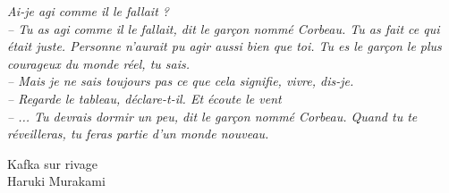 \thispagestyle{empty}



\vspace*{\fill} \epigraph{\itshape  Ai-je agi comme il le fallait ? \\
– Tu as agi comme il le fallait, dit le garçon nommé Corbeau. Tu as fait ce qui était juste. Personne n’aurait pu agir aussi bien que toi. Tu es le garçon le plus courageux du monde réel, tu sais. \\
– Mais je ne sais toujours pas ce que cela signifie, vivre, dis-je. \\
– Regarde le tableau, déclare-t-il. Et écoute le vent \\
– ... Tu devrais dormir un peu, dit le garçon nommé Corbeau. Quand tu te réveilleras, tu feras partie d’un monde nouveau.}{Kafka sur rivage \\ Haruki Murakami \\}
\vfill\clearpage
